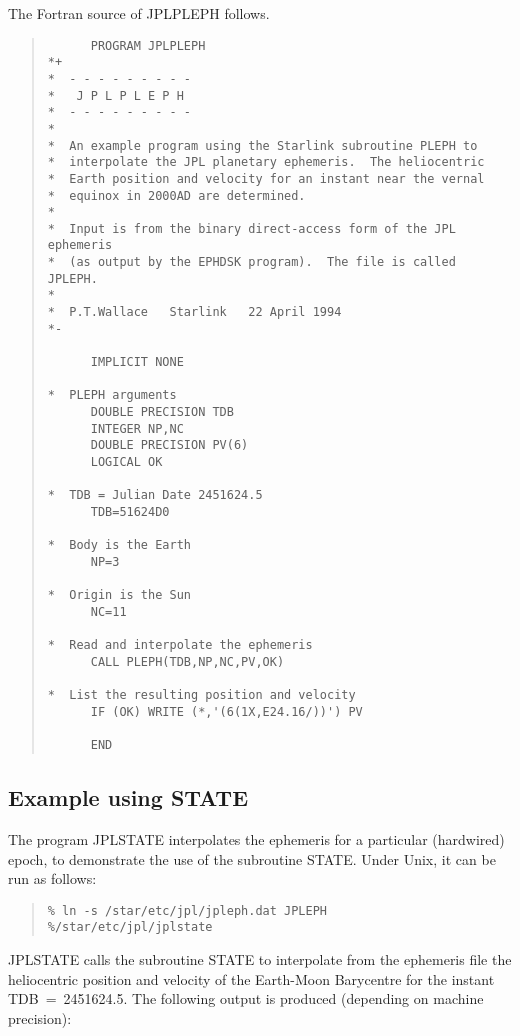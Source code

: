 \documentclass[twoside,11pt]{article}
\newcommand{\xlabel}[1]{}
\renewcommand{\_}{\texttt{\symbol{95}}}
\newcommand{\latexonlysmall}{\small}
\newcommand{\latexonlysmall}{}
\begin{document}
The Fortran source of JPLPLEPH follows.

\begin{quote}
\latexonlysmall
\begin{verbatim}
      PROGRAM JPLPLEPH
*+
*  - - - - - - - - -
*   J P L P L E P H
*  - - - - - - - - -
*
*  An example program using the Starlink subroutine PLEPH to
*  interpolate the JPL planetary ephemeris.  The heliocentric
*  Earth position and velocity for an instant near the vernal
*  equinox in 2000AD are determined.
*
*  Input is from the binary direct-access form of the JPL ephemeris
*  (as output by the EPHDSK program).  The file is called JPLEPH.
*
*  P.T.Wallace   Starlink   22 April 1994
*-

      IMPLICIT NONE

*  PLEPH arguments
      DOUBLE PRECISION TDB
      INTEGER NP,NC
      DOUBLE PRECISION PV(6)
      LOGICAL OK

*  TDB = Julian Date 2451624.5
      TDB=51624D0

*  Body is the Earth
      NP=3

*  Origin is the Sun
      NC=11

*  Read and interpolate the ephemeris
      CALL PLEPH(TDB,NP,NC,PV,OK)

*  List the resulting position and velocity
      IF (OK) WRITE (*,'(6(1X,E24.16/))') PV

      END
\end{verbatim}
\end{quote}

\subsection{\xlabel{example_using_state}Example using STATE}
\label{example_using_state}

The program JPLSTATE interpolates the ephemeris for a particular
(hardwired) epoch, to demonstrate the use of the subroutine STATE.
Under Unix, it can be run as follows:

\begin{quote}
\begin{verbatim}
% ln -s /star/etc/jpl/jpleph.dat JPLEPH
%/star/etc/jpl/jplstate
\end{verbatim}
\end{quote}

JPLSTATE calls the subroutine STATE to interpolate from the ephemeris file
the heliocentric position and velocity of the Earth-Moon Barycentre for
the instant TDB~=~2451624.5. The following output is produced (depending
on machine precision):
\end{document}
